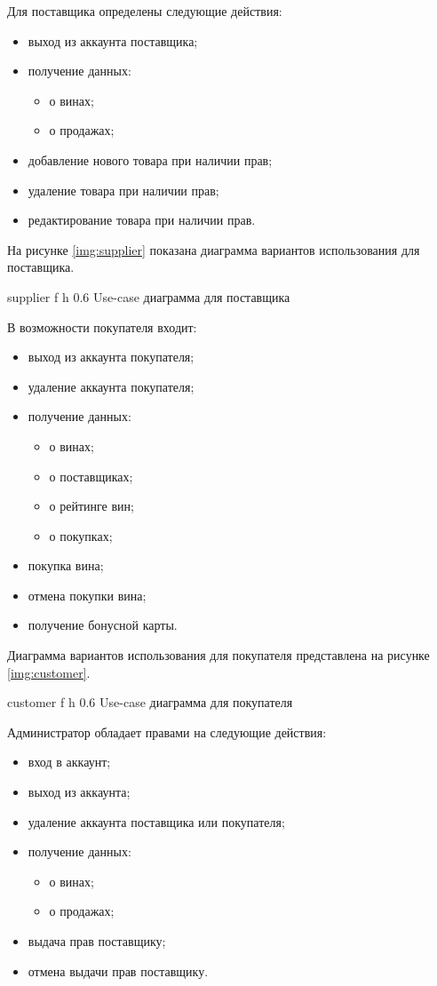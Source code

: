 Для поставщика определены следующие действия:

\begin{itemize}
	\item выход из аккаунта поставщика;
	\item получение данных:
		\begin{itemize}
			\item о винах;
			\item о продажах;
		\end{itemize}		 
	\item добавление нового товара при наличии прав;
	\item удаление товара при наличии прав;
	\item редактирование товара при наличии прав.
\end{itemize}

На рисунке \ref{img:supplier} показана диаграмма вариантов использования для поставщика.

    {supplier}
    {f}
    {h}
    {0.6\textwidth}
    {Use-case диаграмма для поставщика}

В возможности покупателя входит:

\begin{itemize}
	\item выход из аккаунта покупателя;
	\item удаление аккаунта покупателя;
	\item получение данных:
		\begin{itemize}
			\item о винах;
			\item о поставщиках;
			\item о рейтинге вин;
			\item о покупках;
		\end{itemize}
	\item покупка вина;
	\item отмена покупки вина;
	\item получение бонусной карты.	     
\end{itemize}

Диаграмма вариантов использования для покупателя представлена на рисунке \ref{img:customer}.

    {customer}
    {f}
    {h}
    {0.6\textwidth}
    {Use-case диаграмма для покупателя}

Администратор обладает правами на следующие действия:

\begin{itemize}
	\item вход в аккаунт;
	\item выход из аккаунта;
	\item удаление аккаунта поставщика или покупателя;
	\item получение данных:
		\begin{itemize}
			\item о винах;
			\item о продажах;
		\end{itemize}
	\item выдача прав поставщику;
	\item отмена выдачи прав поставщику.
\end{itemize}

